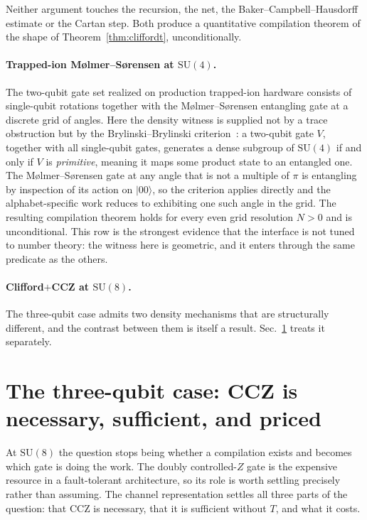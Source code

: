 \documentclass[aps,pra,reprint,nofootinbib,superscriptaddress]{revtex4-2}
\newcommand{\su}[1]{\mathrm{SU}(#1)}
\theoremstyle{plain}
\theoremstyle{definition}
\begin{document}
Neither argument touches the recursion, the net, the
Baker--Campbell--Hausdorff estimate or the Cartan step. Both produce a
quantitative compilation theorem of the shape of Theorem~\ref{thm:cliffordt},
unconditionally.

\paragraph{Trapped-ion M\o lmer--S\o rensen at $\su 4$.} The two-qubit gate set
realized on production trapped-ion hardware consists of single-qubit rotations
together with the M\o lmer--S\o rensen entangling gate at a discrete grid of
angles. Here the density witness is supplied not by a trace obstruction but by
the Brylinski--Brylinski criterion~\cite{Brylinski2002}: a two-qubit gate $V$,
together with all single-qubit gates, generates a dense subgroup of $\su 4$ if
and only if $V$ is \emph{primitive}, meaning it maps some product state to an
entangled one. The M\o lmer--S\o rensen gate at any angle that is not a
multiple of $\pi$ is entangling by inspection of its action on
$\lvert 00\rangle$, so the criterion applies directly and the alphabet-specific
work reduces to exhibiting one such angle in the grid. The resulting
compilation theorem holds for every even grid resolution $N > 0$ and is
unconditional. This row is the strongest evidence that the interface is not
tuned to number theory: the witness here is geometric, and it enters through
the same predicate as the others.

\paragraph{Clifford$+$CCZ at $\su 8$.} The three-qubit case admits two density
mechanisms that are structurally different, and the contrast between them is
itself a result. Sec.~\ref{sec:su8} treats it separately.

\section{The three-qubit case: CCZ is necessary, sufficient, and priced}
\label{sec:su8}

At $\su 8$ the question stops being whether a compilation exists and becomes
which gate is doing the work. The doubly controlled-$Z$ gate is the expensive
resource in a fault-tolerant architecture, so its role is worth settling
precisely rather than assuming. The channel representation settles all three
parts of the question: that CCZ is necessary, that it is sufficient without
$T$, and what it costs.
\end{document}

